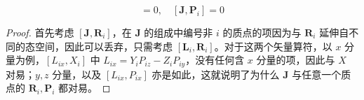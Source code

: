 \documentclass[cn,10pt,math=newtx,citestyle=gb7714-2015,bibstyle=gb7714-2015]{elegantbook}
\def\bm{\boldsymbol}
\begin{document}
\begin{lemma}
    \begin{equation}
        [\bm J,\bm R_i] = 0,\quad [\bm J,\bm P_i] = 0
    \end{equation}
\end{lemma}
\begin{proof}
    首先考虑 $[\bm J,\bm R_i]$，在 $\bm J$ 的组成中编号非 $i$ 的质点的项因为与 $\bm R_i$ 延伸自不同的态空间，因此可以丢弃，只需考虑 $[\bm L_i,\bm R_i]$。对于这两个矢量算符，以 $x$ 分量为例，$[L_{ix}, X_i]$ 中 $L_{ix} = Y_iP_{iz} - Z_iP_{iy}$，没有任何含 $x$ 分量的项，因此与 $X$ 对易；$y,z$ 分量，以及 $[L_{ix},P_{ix}]$ 亦是如此，这就说明了为什么 $\bm J$ 与任意一个质点的 $\bm R_i,\bm P_i$ 都对易。
\end{proof}
\end{document}
